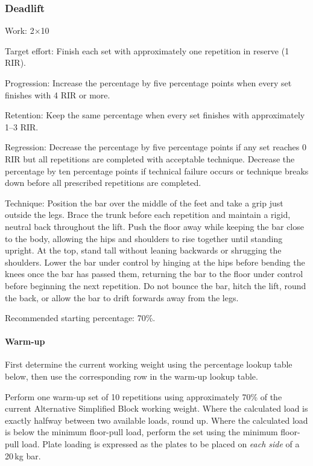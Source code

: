 \documentclass[11pt,a4paper]{article}
\begin{document}
\newpage
\subsubsection{Deadlift}

Work: 2$\times$10

Target effort: Finish each set with approximately one repetition in reserve (1 RIR).

Progression: Increase the percentage by five percentage points when every set finishes with 4 RIR or more.

Retention: Keep the same percentage when every set finishes with approximately 1--3 RIR.

Regression: Decrease the percentage by five percentage points if any set reaches 0 RIR but all repetitions are completed with acceptable technique. Decrease the percentage by ten percentage points if technical failure occurs or technique breaks down before all prescribed repetitions are completed.

Technique: Position the bar over the middle of the feet and take a grip just outside the legs. Brace the trunk before each repetition and maintain a rigid, neutral back throughout the lift. Push the floor away while keeping the bar close to the body, allowing the hips and shoulders to rise together until standing upright. At the top, stand tall without leaning backwards or shrugging the shoulders. Lower the bar under control by hinging at the hips before bending the knees once the bar has passed them, returning the bar to the floor under control before beginning the next repetition. Do not bounce the bar, hitch the lift, round the back, or allow the bar to drift forwards away from the legs.

Recommended starting percentage: 70\%.

\paragraph{Warm-up}

First determine the current working weight using the percentage lookup table below, then use the corresponding row in the warm-up lookup table.

Perform one warm-up set of 10 repetitions using approximately 70\% of the current Alternative Simplified Block working weight. Where the calculated load is exactly halfway between two available loads, round up. Where the calculated load is below the minimum floor-pull load, perform the set using the minimum floor-pull load. Plate loading is expressed as the plates to be placed on \emph{each side} of a 20\,kg bar.
\end{document}
